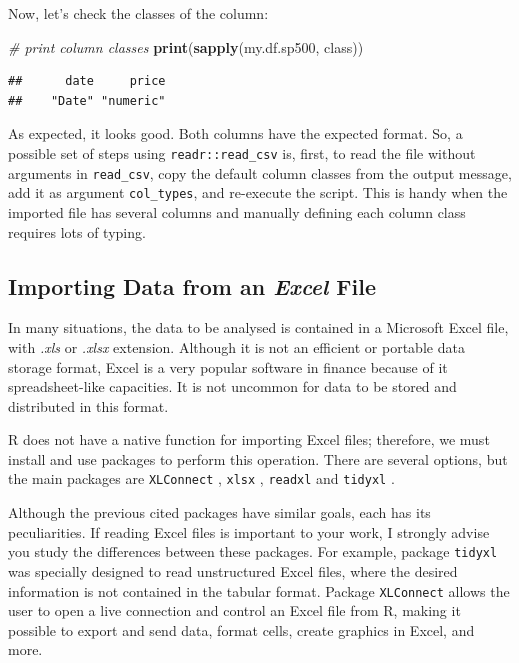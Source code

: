 \documentclass[11pt,]{book}
\newenvironment{Shaded}{\begin{snugshade}}{\end{snugshade}}
\newcommand{\KeywordTok}[1]{\textcolor[rgb]{0.27,0.27,0.27}{\textbf{#1}}}
\newcommand{\CommentTok}[1]{\textcolor[rgb]{0.56,0.35,0.01}{\textit{#1}}}
\newcommand{\NormalTok}[1]{#1}
\begin{document}
Now, let's check the classes of the column:

\begin{Shaded}
\begin{Highlighting}[]
\CommentTok{# print column classes}
\KeywordTok{print}\NormalTok{(}\KeywordTok{sapply}\NormalTok{(my.df.sp500, class))}
\end{Highlighting}
\end{Shaded}

\begin{verbatim}
##      date     price 
##    "Date" "numeric"
\end{verbatim}

As expected, it looks good. Both columns have the expected format. So, a
possible set of steps using \texttt{readr::read\_csv} is, first, to read
the file without arguments in \texttt{read\_csv}, copy the default
column classes from the output message, add it as argument
\texttt{col\_types}, and re-execute the script. This is handy when the
imported file has several columns and manually defining each column
class requires lots of typing.

\subsection{\texorpdfstring{Importing Data from an \emph{Excel}
File}{Importing Data from an Excel File}}\label{importing-data-from-an-excel-file}

In many situations, the data to be analysed is contained in a Microsoft
Excel file, with \emph{.xls} or \emph{.xlsx} extension. Although it is
not an efficient or portable data storage format, Excel is a very
popular software in finance because of it spreadsheet-like capacities.
It is not uncommon for data to be stored and distributed in this format.

R does not have a native function for importing Excel files; therefore,
we must install and use packages to perform this operation. There are
several options, but the main packages are \texttt{XLConnect}
\citep{xlsconnect2016}, \texttt{xlsx} \citep{xlsx2014}, \texttt{readxl}
\citep{readxl2016} and \texttt{tidyxl} \citep{tidyxl}. 
 

Although the previous cited packages have similar goals, each has its
peculiarities. If reading Excel files is important to your work, I
strongly advise you study the differences between these packages. For
example, package \texttt{tidyxl} was specially designed to read
unstructured Excel files, where the desired information is not contained
in the tabular format. Package \texttt{XLConnect} allows the user to
open a live connection and control an Excel file from R, making it
possible to export and send data, format cells, create graphics in
Excel, and more.
\end{document}
